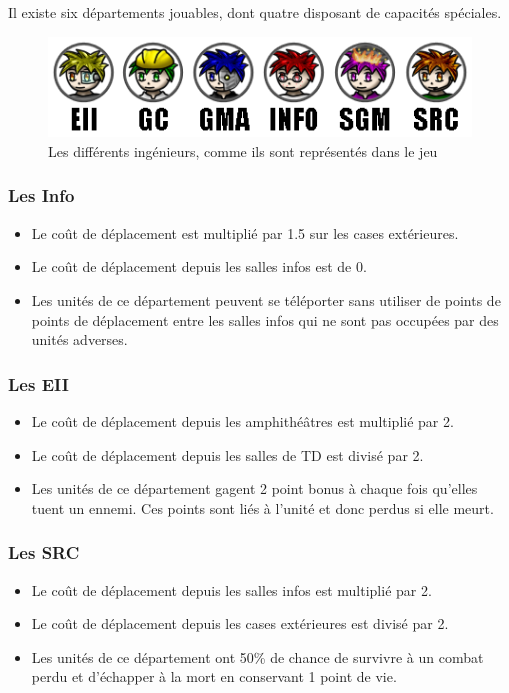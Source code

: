 Il existe six départements jouables, dont quatre disposant de capacités spéciales. 

\begin{figure}[!h]
\centering
\includegraphics[width=.7\textwidth]{Parties/Images/Unites.png}
\caption{Les différents ingénieurs, comme ils sont représentés dans le jeu}
\label{fig:Unites}
\end{figure}

\subsubsection{Les Info}
\begin{itemize}
\item Le coût de déplacement est multiplié par 1.5 sur les cases extérieures.
\item Le coût de déplacement depuis les salles infos est de 0.
\item Les unités de ce département peuvent se téléporter sans utiliser de points de points de déplacement entre les salles infos qui ne sont pas occupées par des unités adverses.
\end{itemize}

\subsubsection{Les EII}
\begin{itemize}
\item Le coût de déplacement depuis les amphithéâtres est multiplié par 2.
\item Le coût de déplacement depuis les salles de TD est divisé par 2.
\item Les unités de ce département gagent 2 point bonus à chaque fois qu'elles tuent un ennemi. Ces points sont liés à l'unité et donc perdus si elle meurt.
\end{itemize} 

\subsubsection{Les SRC}
\begin{itemize}
\item Le coût de déplacement depuis les salles infos est multiplié par 2.
\item Le coût de déplacement depuis les cases extérieures est divisé par 2.
\item Les unités de ce département ont 50\% de chance de survivre à un combat perdu et d'échapper à la mort en conservant 1 point de vie. 
\end{itemize}

